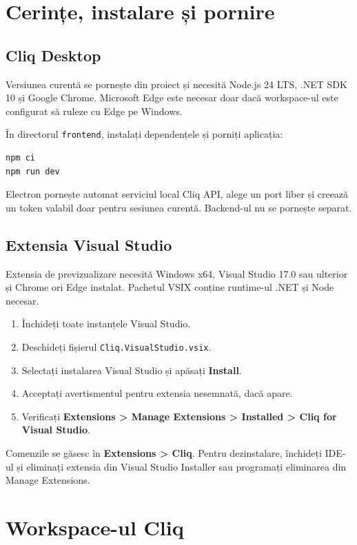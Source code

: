 \documentclass[12pt,a4paper]{report}
\newcommand{\UI}[1]{\textbf{#1}}
\newcommand{\File}[1]{\nolinkurl{#1}}
\begin{document}
\chapter{Cerințe, instalare și pornire}

\section{Cliq Desktop}

Versiunea curentă se pornește din proiect și necesită Node.js 24 LTS, .NET SDK 10 și Google Chrome. Microsoft Edge este necesar doar dacă workspace-ul este configurat să ruleze cu Edge pe Windows.

În directorul \File{frontend}, instalați dependențele și porniți aplicația:

\begin{lstlisting}
npm ci
npm run dev
\end{lstlisting}

Electron pornește automat serviciul local Cliq API, alege un port liber și creează un token valabil doar pentru sesiunea curentă. Backend-ul nu se pornește separat.

\section{Extensia Visual Studio}

Extensia de previzualizare necesită Windows x64, Visual Studio 17.0 sau ulterior și Chrome ori Edge instalat. Pachetul VSIX conține runtime-ul .NET și Node necesar.

\begin{enumerate}
  \item Închideți toate instanțele Visual Studio.
  \item Deschideți fișierul \File{Cliq.VisualStudio.vsix}.
  \item Selectați instalarea Visual Studio și apăsați \UI{Install}.
  \item Acceptați avertismentul pentru extensia nesemnată, dacă apare.
  \item Verificați \UI{Extensions > Manage Extensions > Installed > Cliq for Visual Studio}.
\end{enumerate}

Comenzile se găsesc în \UI{Extensions > Cliq}. Pentru dezinstalare, închideți IDE-ul și eliminați extensia din Visual Studio Installer sau programați eliminarea din Manage Extensions.

\chapter{Workspace-ul Cliq}
\end{document}
